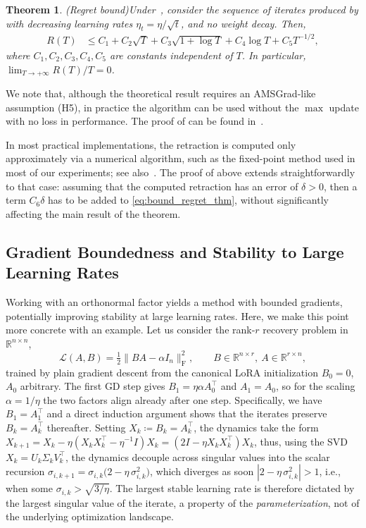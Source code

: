 \documentclass[11pt,a4paper]{article}
\numberwithin{equation}{section}
\let\Sigma\varSigma
\newcommand{\tr}{^{\top}} %
\newcommand{\R}{\mathbb{R}}
\newcommand{\cL}{{\mathcal L}}
\theoremstyle{plain}
\newtheorem{theorem}{Theorem}[section]
\theoremstyle{definition}
\theoremstyle{remark}
\begin{document}
\begin{theorem}(Regret bound)\label{thm:convex_regretbound}
    Under~, consider the sequence of iterates produced by  with decreasing learning rates $\eta_t = \eta/\sqrt{t}$, and no weight decay. Then,
    \begin{align}\label{eq:bound_regret_thm}
        R(T) &\leq   C_1 + C_2\sqrt{T} +C_3 \sqrt{1+\log T} + 
        C_4 \log T + C_5T^{-1/2},
    \end{align}
    where $C_1,C_2,C_3,C_4,C_5$ are constants independent of $T$. In particular,   $\lim_{T \to + \infty}R(T)/T =0$.
\end{theorem}

We note that, although the theoretical result requires an AMSGrad-like assumption (H5), in practice the algorithm can be used without the $\max$ update with no loss in performance. The proof of  can be found in~.

In most practical implementations, the retraction is computed only approximately via a numerical algorithm, such as the fixed-point method used in most of our experiments; see also~. The proof of  above extends straightforwardly to that case: assuming that the computed retraction has an error of $\delta>0$, then a term $C_6\delta$ has to be added to \eqref{eq:bound_regret_thm}, without significantly affecting the main result of the theorem. 


\subsection{Gradient Boundedness and Stability to Large Learning Rates}\label{sec:boundedness}
Working with an orthonormal factor yields a method with bounded gradients, potentially improving stability at large learning rates. Here, we make this point more concrete with an example. Let us consider the rank-$r$ recovery problem in $\R^{n \times n}$,
\[
    \cL(A,B) = \tfrac{1}{2}\|BA - \alpha I_n\|_{\mathrm{F}}^2,
    \qquad B \in \R^{n \times r},\ A \in \R^{r \times n},
\]
trained by plain gradient descent from the canonical LoRA initialization $B_0 = 0$, $A_0$ arbitrary. The first GD step gives $B_1 = \eta\alpha A_0\tr$ and $A_1 = A_0$, so for the scaling $\alpha = 1/\eta$ the two factors align already after one step. Specifically, we have $B_1 = A_1\tr$ and a direct induction argument shows that the iterates preserve $B_k = A_k\tr$ thereafter. Setting $X_k \coloneqq B_k = A_k\tr$, the dynamics take the form $X_{k+1} = X_k - \eta (X_k X_k^\top-\eta^{-1}I)X_k = (2I-\eta X_kX_k^\top)X_k$, thus,  using the SVD $X_k = U_k \Sigma_k V_k\tr$, the dynamics decouple across singular values into the scalar recursion $ \sigma_{i,k+1} = \sigma_{i,k}\bigl(2 - \eta\,\sigma_{i,k}^{2}\bigr) $, which diverges as soon $|2 - \eta\,\sigma_{i,k}^{2}|>1$, i.e., when some $\sigma_{i,k} > \sqrt{3/\eta}$. The largest stable learning rate is therefore dictated by the largest singular value of the iterate, a property of the \emph{parameterization}, not of the underlying optimization landscape.
\end{document}

